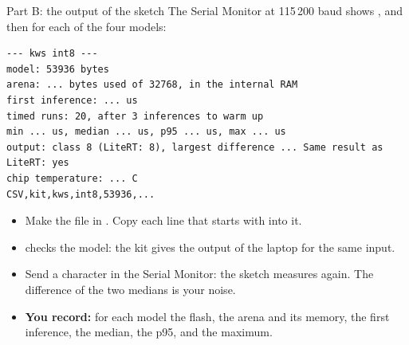\begin{frame}[fragile]{Part B: the output of the sketch}
  \small
  The Serial Monitor at 115\,200 baud shows , and
  then for each of the four models:
\begin{lstlisting}
--- kws int8 ---
model: 53936 bytes
arena: ... bytes used of 32768, in the internal RAM
first inference: ... us
timed runs: 20, after 3 inferences to warm up
min ... us, median ... us, p95 ... us, max ... us
output: class 8 (LiteRT: 8), largest difference ... Same result as LiteRT: yes
chip temperature: ... C
CSV,kit,kws,int8,53936,...
\end{lstlisting}
  \begin{itemize}
    \item Make the file  in . Copy
          each line that starts with  into it.
    \item {} checks the model: the kit gives
          the output of the laptop for the same input.
    \item Send a character in the Serial Monitor: the sketch measures again.
          The difference of the two medians is your noise.
    \item \textbf{You record:} for each model the flash, the arena and its
          memory, the first inference, the median, the p95, and the
          maximum.
  \end{itemize}
\end{frame}

